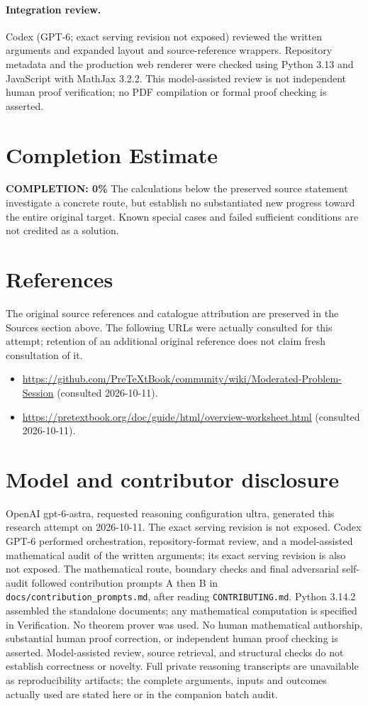 \documentclass[11pt]{article}
\begin{document}
\paragraph{Integration review.} Codex (GPT-6; exact serving revision not exposed) reviewed the written arguments and expanded layout and source-reference wrappers. Repository metadata and the production web renderer were checked using Python 3.13 and JavaScript with MathJax 3.2.2. This model-assisted review is not independent human proof verification; no PDF compilation or formal proof checking is asserted.

\section{Completion Estimate}
\noindent\textbf{COMPLETION: 0\%}
The calculations below the preserved source statement investigate a concrete route,
but establish no substantiated new progress toward the entire original target.
Known special cases and failed sufficient conditions are not credited as a solution.
\section{References}
The original source references and catalogue attribution are preserved in the
Sources section above. The following URLs were actually consulted for this attempt;
retention of an additional original reference does not claim fresh consultation of it.
\begin{itemize}
\item \url{https://github.com/PreTeXtBook/community/wiki/Moderated-Problem-Session} (consulted 2026-10-11). 
\item \url{https://pretextbook.org/doc/guide/html/overview-worksheet.html} (consulted 2026-10-11). 
\end{itemize}
\section{Model and contributor disclosure}
OpenAI gpt-6-astra, requested reasoning configuration ultra, generated this research
attempt on 2026-10-11. The exact serving revision is not exposed. Codex GPT-6
performed orchestration, repository-format review, and a model-assisted mathematical
audit of the written arguments; its exact serving revision
is also not exposed. The mathematical route, boundary checks and final adversarial
self-audit followed contribution prompts A then B in
\texttt{docs/contribution\_prompts.md}, after reading \texttt{CONTRIBUTING.md}.
Python 3.14.2 assembled the standalone documents; any mathematical computation is
specified in Verification. No theorem prover was used. No human mathematical
authorship, substantial human proof correction, or independent human proof checking
is asserted. Model-assisted review, source retrieval, and structural checks do not
establish correctness or novelty. Full private reasoning transcripts are unavailable
as reproducibility artifacts; the complete arguments, inputs and outcomes actually
used are stated here or in the companion batch audit.
\end{document}
